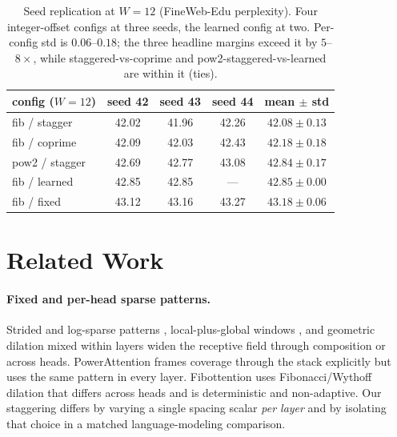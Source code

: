 \documentclass[11pt]{article}
\begin{document}
\begin{table}[htbp]
\centering
\small
\begin{tabular}{lcccc}
\toprule
config ($W{=}12$) & seed 42 & seed 43 & seed 44 & mean $\pm$ std \\
\midrule
fib / stagger        & 42.02 & 41.96 & 42.26 & $42.08 \pm 0.13$ \\
fib / coprime        & 42.09 & 42.03 & 42.43 & $42.18 \pm 0.18$ \\
pow2 / stagger       & 42.69 & 42.77 & 43.08 & $42.84 \pm 0.17$ \\
fib / learned        & 42.85 & 42.85 & ---   & $42.85 \pm 0.00$ \\
fib / fixed          & 43.12 & 43.16 & 43.27 & $43.18 \pm 0.06$ \\
\bottomrule
\end{tabular}
\caption{Seed replication at $W{=}12$ (FineWeb-Edu perplexity). Four
integer-offset configs at three seeds, the learned config at two. Per-config std
is $0.06$--$0.18$; the three headline margins exceed it by $5$--$8\times$, while
staggered-vs-coprime and pow2-staggered-vs-learned are within it (ties).}
\label{tab:seed}
\end{table}

\section{Related Work}
\label{sec:related}

\paragraph{Fixed and per-head sparse patterns.}
Strided and log-sparse patterns \citep{child2019sparse}, local-plus-global
windows \citep{beltagy2020longformer,zaheer2020bigbird}, and geometric dilation
mixed within layers \citep{ding2023longnet} widen the receptive field through
composition or across heads. PowerAttention \citep{powerattention2025} frames
coverage through the stack explicitly but uses the same pattern in every layer.
Fibottention \citep{fibottention2024} uses Fibonacci/Wythoff dilation that differs
across heads and is deterministic and non-adaptive. Our staggering differs by
varying a single spacing scalar \emph{per layer} and by isolating that choice in a
matched language-modeling comparison.
\end{document}
